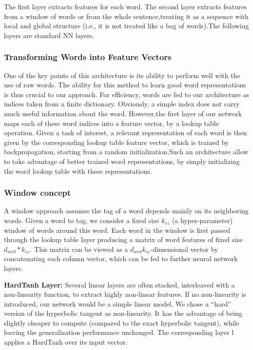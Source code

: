 \documentclass[12pt,a4paper,final]{extreport}
\begin{document}
The first layer extracts features for each word. The second layer extracts features from a window of words or from the whole sentence,treating it as a sequence with local and global structure (i.e., it is not treated like a bag of words).The following layers are standard NN layers.

\subsubsection{Transforming Words into Feature Vectors}
One of the key points of this architecture is its ability to perform well with the use of raw words. The ability for this method to learn good word representations is thus crucial to our approach. For efficiency, words are fed to our architecture as indices taken from a finite dictionary. Obviously, a simple index does not carry much useful information about the word. However,the first layer of our network maps each of these word indices into a feature vector, by a lookup
table operation. Given a task of interest, a relevant representation of each word is then given by the corresponding lookup table feature vector, which is trained by backpropagation, starting from
a random initialization.Such an architecture allow to take advantage of better trained word representations, by simply initializing the word lookup table with these representations.

\subsubsection{Window concept}
A window approach assumes the tag of a word depends mainly on its neighboring words. Given a word to tag, we consider a fixed size $k_{sz}$ (a hyper-parameter) window of words around this word.
Each word in the window is first passed through the lookup table layer producing a matrix
of word features of fixed size $d_{wrd}*k_{sz}$. This matrix can be viewed as a $d_{wrd}k_{sz}$-dimensional vector by concatenating each column vector, which can be fed to further neural network layers.

\vspace{0.5cm}
\textbf{HardTanh Layer:} Several linear layers are often stacked, interleaved with a non-linearity function,
to extract highly non-linear features. If no non-linearity is introduced, our network would be a
simple linear model. We chose a “hard” version of the hyperbolic tangent as non-linearity. It has the
advantage of being slightly cheaper to compute (compared to the exact hyperbolic tangent), while
leaving the generalization performance unchanged. The corresponding layer l
applies a HardTanh over its input vector.
\end{document}
